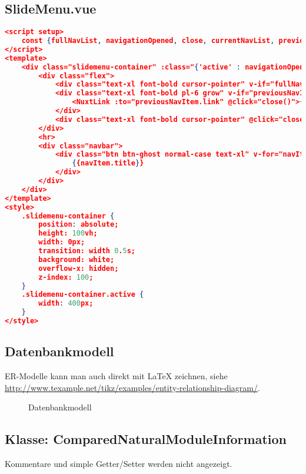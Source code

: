 \subsection{SlideMenu.vue}
\label{SlideMenu.vue}

\begin{lstlisting}[language=json,firstnumber=1]
<script setup>
    const {fullNavList, navigationOpened, close, currentNavList, previousNavItem, navigate, back} = useNavigation();
</script>
<template>
    <div class="slidemenu-container" :class="{'active' : navigationOpened}">
        <div class="flex">
            <div class="text-xl font-bold cursor-pointer" v-if="fullNavList != currentNavList" @click="back()">back</div>
            <div class="text-xl font-bold pl-6 grow" v-if="previousNavItem">
                <NuxtLink :to="previousNavItem.link" @click="close()">{{previousNavItem.title}}</NuxtLink>
            </div>
            <div class="text-xl font-bold cursor-pointer" @click="close()">X</div>
        </div>
        <hr>
        <div class="navbar">
            <div class="btn btn-ghost normal-case text-xl" v-for="navItem in currentNavList" :key="navItem.uid" @click="navigate(navItem)">
                {{navItem.title}}
            </div>
        </div>
    </div>
</template>
<style>
    .slidemenu-container {
        position: absolute;
        height: 100vh;
        width: 0px;
        transition: width 0.5s;
        background: white;
        overflow-x: hidden;
        z-index: 100;
    }
    .slidemenu-container.active {
        width: 400px;
    }
</style>
\end{lstlisting}

\subsection{Datenbankmodell}
\label{app:Datenbankmodell}
ER-Modelle kann man auch direkt mit \LaTeX{} zeichnen, siehe \zB \url{http://www.texample.net/tikz/examples/entity-relationship-diagram/}.
\begin{figure}[htb]
\centering
{}
\caption{Datenbankmodell}
\end{figure}
\clearpage


\clearpage


\clearpage


\subsection{Klasse: ComparedNaturalModuleInformation}
\label{app:CNMI}
Kommentare und simple Getter/Setter werden nicht angezeigt.

\clearpage

